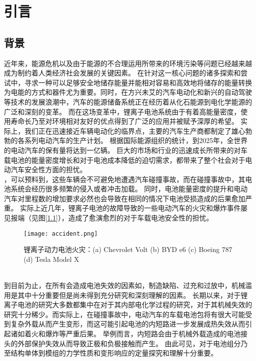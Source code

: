 \chapter{引言}
\section{背景}
近年来，能源危机以及由于能源的不合理运用所带来的环境污染\cite{Goodenough2015Energy}等问题已经越来越成为制约着人类经济社会发展的关键因素。
在针对这一核心问题的诸多探索和尝试中，寻求一种可以足够安全地储存能量并能相对容易和高效地将储存的能量转换为电能的方式和器件尤为重要\cite{Feng2017Thermal}。同时，在方兴未艾的汽车电动化和新兴的自动驾驶等技术的发展浪潮中，汽车的能源储备系统正在经历着从化石能源到电化学能源\cite{Shan2016The,Tarascon2001Issues,Dunn2011Electrical}的广泛和深刻的变革。 而在这场变革中，锂离子电池系统由于有着高能量密度，使用寿命长乃至对环境相对友好的优点得到了广泛的应用\cite{Yoshio2003Spherical,Taberna2006High}并被赋予深厚的希望。 实际上，我们正在迅速接近车辆电动化的临界点，主要的汽车生产商都制定了雄心勃勃的各系列电动汽车的生产计划。 根据国际能源组织的统计，到2025年，全世界的电动汽车的保有量将达到一亿辆\cite{plan}。 巨大的市场和行业的迅速成长所带来的对车载电池的能量密度增长和对于电池成本降低的迫切需求，都带来了整个社会对于电动汽车安全性方面的担忧\cite{Zhu2018A}。\\
，可以预料到，这些车辆会不可避免地遭遇汽车碰撞事故，而在碰撞事故中，其电池系统会经历很多频繁的侵入或者冲击加载\cite{Xu2016Computational}。 同时，电池能量密度的提升和电动汽车对里程数的增加要求必然也会导致在相同的情况下电池受损造成的后果愈加严重。 实际上近几年，锂离子电池的故障导致的一些电动汽车的火灾和爆炸事件屡见报端\cite{volt,BYD,boeing,Tesla}（见图[\ref{fig:accident}]），造成了愈演愈烈的对于车载电池安全性的担忧。
\begin{figure}
\centering   
\texttt{[image: accident.png]}
\caption{锂离子动力电池火灾：(a) Chevrolet Volt (b) BYD e6 (c) Boeing 787 (d) Tesla Model X } 
\label{fig:accident}
\end{figure}
\\
\indent 到目前为止，在所有会造成电池失效的因素如，制造缺陷、过充和过放\cite{Kermani2017Review}中，机械滥用是其中十分重要但是尚未得到充分研究和深刻理解的因素。 长期以来，对于锂离子电池的研究大多数都集中在对于其内部电化学过程的研究，对于其机械失效的研究十分稀少。而实际上，在碰撞事故中，电动汽车的车载电池包将有很大可能受到复杂外载从而产生变形，而这可能引起电池的内短路进一步发展成热失效从而引起诸如着火和爆炸等严重后果。 举例而言，内短路会由于机械外载造成的电池接头的外部保护失效从而导致正极和负极接触而产生。 由此可见，对于电池组分乃至结构单体到模组的力学性质和变形响应的定量探究和理解十分重要。\\

